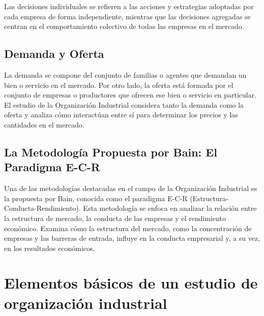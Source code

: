 \documentclass[
  a4paper,
]{article}
\begin{document}
Las decisiones individuales se refieren a las acciones y estrategias
adoptadas por cada empresa de forma independiente, mientras que las
decisiones agregadas se centran en el comportamiento colectivo de todas
las empresas en el mercado.

\hypertarget{demanda-y-oferta}{%
\subsection{Demanda y Oferta}\label{demanda-y-oferta}}

La demanda se compone del conjunto de familias o agentes que demandan un
bien o servicio en el mercado. Por otro lado, la oferta está formada por
el conjunto de empresas o productores que ofrecen ese bien o servicio en
particular. El estudio de la Organización Industrial considera tanto la
demanda como la oferta y analiza cómo interactúan entre sí para
determinar los precios y las cantidades en el mercado.

\hypertarget{la-metodologuxeda-propuesta-por-bain-el-paradigma-e-c-r}{%
\subsection{La Metodología Propuesta por Bain: El Paradigma
E-C-R}\label{la-metodologuxeda-propuesta-por-bain-el-paradigma-e-c-r}}

Una de las metodologías destacadas en el campo de la Organización
Industrial es la propuesta por Bain, conocida como el paradigma E-C-R
(Estructura-Conducta-Rendimiento). Esta metodología se enfoca en
analizar la relación entre la estructura de mercado, la conducta de las
empresas y el rendimiento económico. Examina cómo la estructura del
mercado, como la concentración de empresas y las barreras de entrada,
influye en la conducta empresarial y, a su vez, en los resultados
económicos.

\hypertarget{elementos-buxe1sicos-de-un-estudio-de-organizaciuxf3n-industrial}{%
\section{Elementos básicos de un estudio de organización
industrial}\label{elementos-buxe1sicos-de-un-estudio-de-organizaciuxf3n-industrial}}
\end{document}
